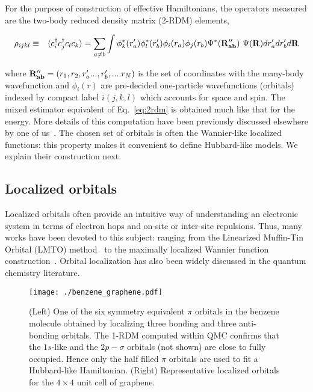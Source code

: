 \documentclass[aip,jcp,twocolumn,10pt]{revtex4-1}
\begin{document}
For the purpose of construction of effective Hamiltonians, the operators measured are the two-body reduced density matrix (2-RDM) 
elements, 
\begin{widetext}
\begin{eqnarray}
	\rho_{ijkl} &\equiv& \langle c_{i}^{\dagger} c_{j}^{\dagger} c_l c_k \rangle = \sum_{ a \neq b} \int \phi^{*}_k (r'_a) \phi^{*}_l (r'_b) \phi_i(r_a) \phi_j(r_b) \Psi^{*}({\bf{R}''_{ab}})~\Psi ({\bf{R}}) dr'_a dr'_b d {\bf{R}}
\label{eq:2rdm}
\end{eqnarray}
\end{widetext}
where $ {\bf{R}''_{ab}} = (r_1,r_2, r'_a..., r'_b,....r_N)$ is the set of coordinates with 
the many-body wavefunction and $\phi_i(r)$ 
are pre-decided one-particle wavefunctions (orbitals) indexed by compact 
label $i (j,k,l)$ which accounts for space and spin. 
The mixed estimator equivalent of Eq.~\eqref{eq:2rdm} 
is obtained much like that for the energy. 
More details of this computation 
have been previously discussed elsewhere by one of us~\cite{Wagner_JCP}. The chosen set of orbitals 
is often the Wannier-like localized functions: this property 
makes it convenient to define Hubbard-like models. 
We explain their construction next. 

\subsection{Localized orbitals}
\label{subsec:wannier}
Localized orbitals often provide an intuitive way of understanding an electronic 
system in terms of electron hops and on-site or inter-site repulsions. 
Thus, many works have been devoted to this subject: ranging from the Linearized Muffin-Tin 
Orbital (LMTO) method~\cite{Andersen} to the maximally localized Wannier 
function construction~\cite{Marzari_Wf}. 
Orbital localization has also been widely discussed 
in the quantum chemistry literature. 

\begin{figure}[htpb]
\centering
\texttt{[image: ./benzene\_graphene.pdf]}
\caption{(Left) One of the six symmetry equivalent $\pi$ orbitals in the 
benzene molecule obtained by localizing three bonding 
and three anti-bonding orbitals. The 1-RDM computed within QMC 
confirms that the $1 s$-like and the $2p - \sigma$ orbitals 
(not shown) are close to fully occupied. 
Hence only the half filled $\pi$ orbitals are used to fit a Hubbard-like Hamiltonian. 
(Right) Representative localized orbitals for the $4\times4$ unit cell of graphene.}
\label{fig:orbs} 
\end{figure}	
\end{document}
